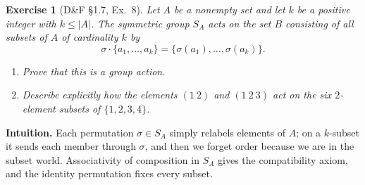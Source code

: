 \documentclass[12pt]{article}
\newtheorem{exercise}[theorem]{Exercise}
\theoremstyle{definition}
\begin{document}
\begin{exercise}[D\&F §1.7, Ex.~8]
Let $A$ be a nonempty set and let $k$ be a positive integer with $k \le |A|$. The symmetric group $S_A$
acts on the set $B$ consisting of all subsets of $A$ of cardinality $k$ by
\[
\sigma \cdot \{a_1,\dots,a_k\}=\{\sigma(a_1),\dots,\sigma(a_k)\}.
\]
\begin{enumerate}
\item[(a)] Prove that this is a group action.
\item[(b)] Describe explicitly how the elements $(1\ 2)$ and $(1\ 2\ 3)$ act on the six $2$-element subsets of $\{1,2,3,4\}$.
\end{enumerate}
\end{exercise}

\dotfill

\noindent\textbf{Intuition.}
Each permutation $\sigma\in S_A$ simply relabels elements of $A$; on a $k$-subset it sends each member through $\sigma$,
and then we forget order because we are in the subset world. Associativity of composition in $S_A$ gives the compatibility axiom,
and the identity permutation fixes every subset.\\

\dotfill
\end{document}
